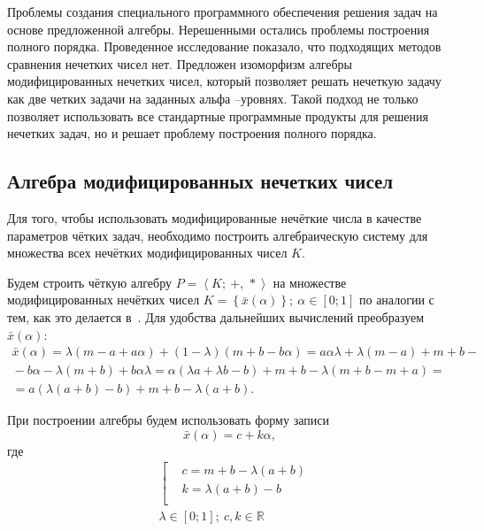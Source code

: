 Проблемы создания специального программного обеспечения решения задач на основе предложенной алгебры. Нерешенными остались проблемы построения полного порядка. Проведенное исследование показало, что подходящих методов сравнения нечетких чисел нет.
Предложен изоморфизм алгебры модифицированных нечетких чисел, который позволяет решать нечеткую задачу как две четких задачи на заданных альфа –уровнях.
Такой подход не только позволяет использовать все стандартные программные продукты для решения нечетких задач, но и решает проблему построения полного порядка.

\subsection{Алгебра модифицированных нечетких чисел}
Для того, чтобы использовать модифицированные нечёткие числа в качестве параметров чётких задач, необходимо построить алгебраическую систему для множества всех нечётких модифицированных чисел $K$.

Будем строить чёткую алгебру $P=\left\langle K ;\ +,\,* \right\rangle$ на множестве модифицированных нечётких чисел $K=\left\{ \bar{x}\left( \alpha  \right) \right\};\ \alpha \in \left[ 0;1 \right]$ по аналогии с тем, как это делается в~\cite{Yakhyaeva}. Для удобства дальнейших вычислений преобразуем $\bar{x}\left( \alpha \right)$:
\begin{gather*}
  \bar{x}\left( \alpha  \right)=\lambda \left( m-a+a\alpha  \right)+\left( 1-\lambda  \right)\left( m+b-b\alpha  \right)=a\alpha \lambda +\lambda \left( m-a \right)+m+b-{}\\
  {}-b\alpha -\lambda \left( m+b \right)+b\alpha \lambda =\alpha \left( \lambda a+\lambda b-b \right)+m+b-\lambda \left( m+b-m+a \right)={}\\
  {}=a\left( \lambda \left( a+b \right)-b \right)+m+b-\lambda \left( a+b \right).
\end{gather*}

При построении алгебры будем использовать форму записи
\begin{equation}
\label{eq:modified-number-base}
  \bar{x}\left( \alpha  \right)=c+k\alpha,
\end{equation}
где
\begin{equation}
\label{eq:modified-number-from-abm}
  \begin{aligned}
    & \left[ \begin{aligned}
    & c=m+b-\lambda \left( a+b \right) \\ 
    & k=\lambda \left( a+b \right)-b \\ 
  \end{aligned} \right. \\ 
  & \lambda \in \left[ 0;1 \right];\ c,k\in \mathbb{R} \\ 
\end{aligned}
\end{equation}

